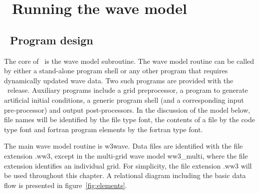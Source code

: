
\section{~Running the wave model} \label{chapt:run}
\newcounters
\vssub
\subsection{~Program design}
\vssub

The core of \ws\ is the wave model subroutine. The wave model routine can be
called by either a stand-alone program shell or any other program that
requires dynamically updated wave data. Two such programs are provided with
the \ws\ release. Auxiliary programs include a grid preprocessor, a program to
generate artificial initial conditions, a generic program shell (and a
corresponding input pre-processor) and output post-processors.  In the
discussion of the model below, file names will be identified by the {\file
file} type font, the contents of a file by the {\code code} type font and {\sc
fortran} program elements by the {\F fortran} type font.

The main wave model routine is {\F w3wave}. Data files are identified with the
file extension {\file .ww3}, except in the multi-grid wave model {\file
ww3\_multi}, where the file extension identifies an individual grid. For
simplicity, the file extension {\file .ww3} will be used throughout this
chapter.  A relational diagram including the basic data flow is presented in
figure~\ref{fig:elements}.


